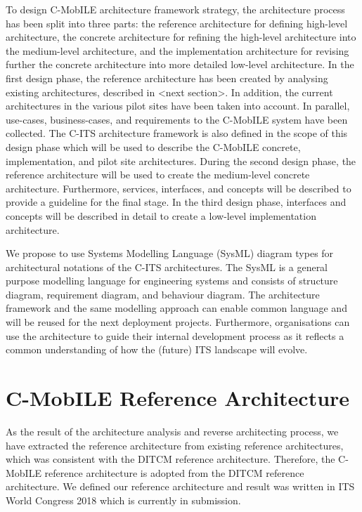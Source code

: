 \documentclass[conference]{IEEEtran}
\begin{document}
To design C-MobILE architecture framework strategy, the architecture process has been split into three parts: the reference architecture for defining high-level architecture, the concrete architecture for refining the high-level architecture into the medium-level architecture, and the implementation architecture for revising further the concrete architecture into more detailed low-level architecture. In the first design phase, the reference architecture has been created by analysing existing architectures, described in <next section>. In addition, the current architectures in the various pilot sites have been taken into account. In parallel, use-cases, business-cases, and requirements to the C-MobILE system have been collected. The C-ITS architecture framework is also defined in the scope of this design phase which will be used to describe the C-MobILE concrete, implementation, and pilot site architectures. During the second design phase, the reference architecture will be used to create the medium-level concrete architecture. Furthermore, services, interfaces, and concepts will be described to provide a guideline for the final stage. In the third design phase, interfaces and concepts will be described in detail to create a low-level implementation architecture.

We propose to use Systems Modelling Language (SysML) diagram types for architectural notations of the C-ITS architectures. The SysML is a general purpose modelling language for engineering systems and consists of structure diagram, requirement diagram, and behaviour diagram. The architecture framework and the same modelling approach can enable common language and will be reused for the next deployment projects. Furthermore, organisations can use the architecture to guide their internal development process as it reflects a common understanding of how the (future) ITS landscape will evolve.


\section{C-MobILE Reference Architecture}

As the result of the architecture analysis and reverse architecting process, we have extracted the reference architecture from existing reference architectures, which was consistent with the DITCM reference architecture. Therefore, the C-MobILE reference architecture is adopted from the DITCM reference architecture. We defined our reference architecture and result was written in ITS World Congress 2018 which is currently in submission.
\end{document}

